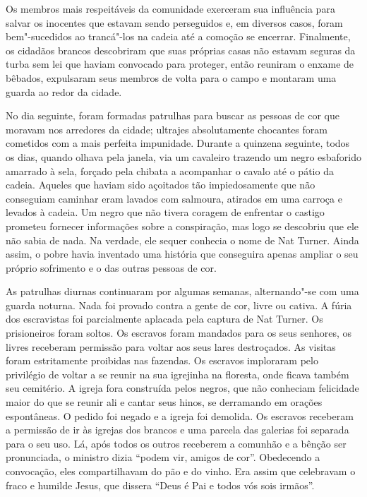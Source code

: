 Os
membros mais respeitáveis da comunidade exerceram sua influência para
salvar os inocentes que estavam sendo perseguidos e, em diversos casos,
foram bem"-sucedidos ao trancá"-los na cadeia até a comoção se encerrar.
Finalmente, os cidadãos brancos descobriram que suas próprias casas não
estavam seguras da turba sem lei que haviam convocado para proteger,
então reuniram o enxame de bêbados, expulsaram seus membros de volta
para o campo e montaram uma guarda ao redor da cidade.

No dia seguinte, foram formadas
patrulhas para buscar as pessoas de cor que moravam nos arredores da
cidade; ultrajes absolutamente chocantes foram cometidos com a mais
perfeita impunidade. Durante a quinzena seguinte, todos os dias, quando
olhava pela janela, via um cavaleiro trazendo um negro esbaforido
amarrado à sela, forçado pela chibata a acompanhar o cavalo até o pátio
da cadeia. Aqueles que haviam sido açoitados tão impiedosamente que não
conseguiam caminhar eram lavados com salmoura, atirados em uma carroça e
levados à cadeia. Um negro que não tivera coragem de enfrentar o castigo
prometeu fornecer informações sobre a conspiração, mas logo se descobriu
que ele não sabia de nada. Na verdade, ele sequer conhecia o nome de Nat
Turner. Ainda assim, o pobre havia inventado uma história que conseguira
apenas ampliar o seu próprio sofrimento e o das outras pessoas de cor.

As patrulhas diurnas continuaram por
algumas semanas, alternando"-se com uma guarda noturna. Nada foi provado
contra a gente de cor, livre ou cativa. A fúria dos escravistas foi
parcialmente aplacada pela captura de Nat Turner. Os prisioneiros foram
soltos. Os escravos foram mandados para os seus senhores, os livres
receberam permissão para voltar aos seus lares destroçados. As visitas
foram estritamente proibidas nas fazendas. Os escravos imploraram pelo
privilégio de voltar a se reunir na sua igrejinha na floresta, onde
ficava também seu cemitério. A igreja fora construída pelos negros, que
não conheciam felicidade maior do que se reunir ali e cantar seus hinos,
se derramando em orações espontâneas. O pedido foi negado e a igreja foi
demolida. Os escravos receberam a permissão de ir às igrejas dos brancos
e uma parcela das galerias foi separada para o seu uso. Lá, após todos
os outros receberem a comunhão e a bênção ser pronunciada, o ministro
dizia ``podem vir, amigos de cor''. Obedecendo a convocação, eles
compartilhavam do pão e do vinho. Era assim que celebravam o fraco e
humilde Jesus, que dissera ``Deus é Pai e todos vós sois irmãos''.

